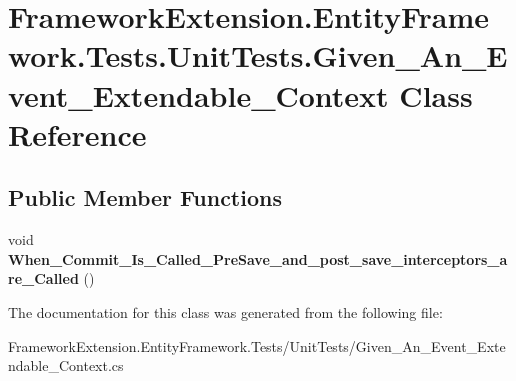 \hypertarget{class_framework_extension_1_1_entity_framework_1_1_tests_1_1_unit_tests_1_1_given___an___event___extendable___context}{\section{Framework\-Extension.\-Entity\-Framework.\-Tests.\-Unit\-Tests.\-Given\-\_\-\-An\-\_\-\-Event\-\_\-\-Extendable\-\_\-\-Context Class Reference}
\label{class_framework_extension_1_1_entity_framework_1_1_tests_1_1_unit_tests_1_1_given___an___event___extendable___context}
}
\subsection*{Public Member Functions}
\begin{DoxyCompactItemize}
\item 
\hypertarget{class_framework_extension_1_1_entity_framework_1_1_tests_1_1_unit_tests_1_1_given___an___event___extendable___context_a0060725c30d3161b46bc5463e83d213b}{void {\bfseries When\-\_\-\-Commit\-\_\-\-Is\-\_\-\-Called\-\_\-\-Pre\-Save\-\_\-and\-\_\-post\-\_\-save\-\_\-interceptors\-\_\-are\-\_\-\-Called} ()}\label{class_framework_extension_1_1_entity_framework_1_1_tests_1_1_unit_tests_1_1_given___an___event___extendable___context_a0060725c30d3161b46bc5463e83d213b}

\end{DoxyCompactItemize}


The documentation for this class was generated from the following file\-:\begin{DoxyCompactItemize}
\item 
Framework\-Extension.\-Entity\-Framework.\-Tests/\-Unit\-Tests/Given\-\_\-\-An\-\_\-\-Event\-\_\-\-Extendable\-\_\-\-Context.\-cs\end{DoxyCompactItemize}

